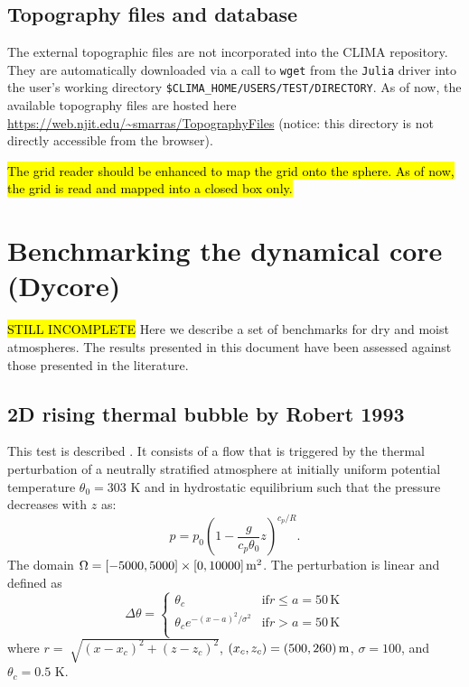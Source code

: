 \documentclass{article}
\begin{document}
\subsection{Topography files and database}
The external topographic files are not incorporated into the CLIMA repository. 
They are automatically downloaded via a call to {\tt wget} from the {\tt Julia} driver into the user's working directory {\tt \$CLIMA\_HOME/USERS/TEST/DIRECTORY}. As of now, the available topography files are hosted here \url{https://web.njit.edu/~smarras/TopographyFiles} (notice: this directory is not directly accessible from the browser).

\hl{The grid reader should be enhanced to map the grid onto the sphere. As of now, the grid is read and mapped into a closed box only.}

\section{Benchmarking the dynamical core (Dycore)}

\hl{STILL INCOMPLETE}
Here we describe a set of benchmarks for dry and moist atmospheres. The results presented in this document have been assessed against those presented in the literature. 

\subsection{2D rising thermal bubble by Robert 1993}
\label{2dRTBtest}
This test is described \cite{robert1993}. It consists of a flow that is triggered by the thermal perturbation of a neutrally stratified atmosphere at initially uniform potential temperature $\theta_0 = 303$ K
and in hydrostatic equilibrium such that the pressure decreases with $z$ as:
\begin{equation}
\label{pressureDistrib}
p = p_{0}\left(1-\frac{g}{c_p{\theta_{0}}}z\right)^{c_p/R}.
\end{equation}
The domain $\Omega=[-5000,5000]\times[0,10000]\,{\rm m}^2$.
The perturbation is linear and defined as
\begin{equation}
 \Delta\theta = \left\{ \begin{array}{ll}
 \theta_c & \mathrm{if } r \leq a=50\,{\mathrm K}\\
 \theta_c e^{-(x - a)^2/\sigma^2} & \mathrm{if } r > a=50\,{\mathrm K}\\
\end{array} \right.
\label{eq:robertIni}
\end{equation}
where $r = \sqrt[]{(x-x_{c})^{2} + (z-z_{c})^{2}}$, $(x_c,z_c) = (500,260)\,{\rm m}$, $\sigma = 100$, and $\theta_c=0.5$ K.
\end{document}
